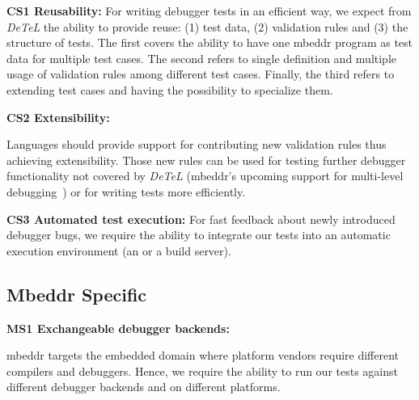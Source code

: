 \textbf{\label{CS1}CS1 Reusability:} For writing debugger tests in
an efficient way, we expect from \emph{DeTeL} the ability to provide reuse: (1)
test data, (2) validation rules and (3) the structure of tests. The first covers
the ability to have one mbeddr program as test data for multiple test cases.
The second refers to single definition and multiple usage of validation rules
among different test cases. Finally, the third refers to extending test cases
and having the possibility to specialize them.

\textbf{\label{CS2}CS2 Extensibility:} 

Languages should provide support for contributing new
validation rules thus achieving extensibility. Those new rules can be used for
testing further debugger functionality not covered by \emph{DeTeL} (\eg mbeddr's
upcoming support for multi-level debugging~\cite{MultiLevelDebugging:WSRE:breakedForInlining}) 
or for writing tests more efficiently.


\textbf{\label{CS3}CS3 Automated test execution:} For fast
feedback about newly introduced debugger bugs, 
we require the ability to integrate our 
tests into an automatic execution environment (\eg an  or a build
server).

\subsection{Mbeddr Specific}

\textbf{\label{MS1}MS1 Exchangeable debugger backends:}

mbeddr targets the embedded domain where platform vendors require different
compilers and debuggers. Hence, we require the ability to run our tests against
different debugger backends and on different platforms. 
